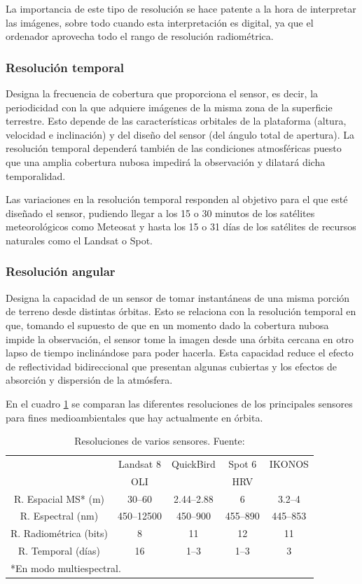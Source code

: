 La importancia de este tipo de resolución se hace patente a la hora de interpretar las imágenes, sobre todo cuando esta interpretación es digital, ya que el ordenador aprovecha todo el rango de resolución radiométrica.

\subsubsection{Resolución temporal}
Designa la frecuencia de cobertura que proporciona el sensor, es decir, la periodicidad con la que adquiere imágenes de la misma zona de la superficie terrestre. Esto depende de las características orbitales de la plataforma (altura, velocidad e inclinación) y del diseño del sensor (del ángulo total de apertura). La resolución temporal dependerá también de las condiciones atmosféricas puesto que una amplia cobertura nubosa impedirá la observación y dilatará dicha temporalidad.%

Las variaciones en la resolución temporal responden al objetivo para el que esté diseñado el sensor, pudiendo llegar a los 15 o 30 minutos de los satélites meteorológicos como Meteosat y hasta los 15 o 31 días de los satélites de recursos naturales como el Landsat o Spot.

\subsubsection{Resolución angular}
Designa la capacidad de un sensor de tomar instantáneas de una misma porción de terreno desde distintas órbitas. Esto se relaciona con la resolución temporal en que, tomando el supuesto de que en un momento dado la cobertura nubosa impide la observación, el sensor tome la imagen desde una órbita cercana en otro lapso de tiempo inclinándose para poder hacerla. Esta capacidad reduce el efecto de reflectividad bidireccional que presentan algunas cubiertas y los efectos de absorción y dispersión de la atmósfera.%

En el cuadro \ref{tab:resoluciones} se comparan las diferentes resoluciones de los principales sensores para fines medioambientales que hay actualmente en órbita.

\begin{table}[ht]
	\centering
	\begin{tabular}{@{}ccccc@{}}
	\toprule[0.4mm]
	& Landsat 8 & QuickBird & Spot 6 & IKONOS \\
	& OLI & & HRV & \\
	\midrule
	R. Espacial MS* (m) & 30--60 & 2.44--2.88 & 6 & 3.2--4 \\
	R. Espectral (nm) & 450--12500 & 450--900 & 455--890 & 445--853 \\
	R. Radiométrica (bits) & 8 & 11 & 12 & 11 \\
	R. Temporal (días) & 16 & 1--3 & 1--3 & 3 \\
	\bottomrule[0.4mm]
	\multicolumn{3}{l}{\footnotesize{*En modo multiespectral.}}
	\end{tabular}
	\caption[Resoluciones de varios sensores]{Resoluciones de varios sensores. Fuente: \cite{labrador2012satelites}}
	\label{tab:resoluciones}
\end{table}

